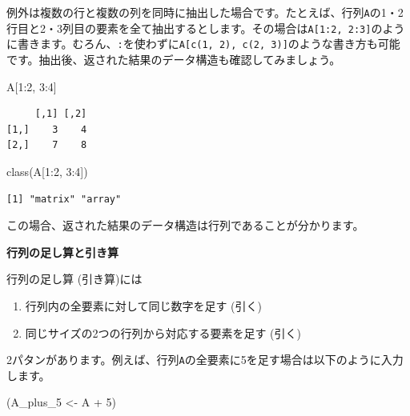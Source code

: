 \documentclass[
  a4paper,
  pandoc,
  ja=standard,
  jafont=haranoaji]{bxjsbook}
\newenvironment{Shaded}{\begin{snugshade}}{\end{snugshade}}
\newcommand{\DecValTok}[1]{\textcolor[rgb]{0.68,0.00,0.00}{#1}}
\newcommand{\FunctionTok}[1]{\textcolor[rgb]{0.28,0.35,0.67}{#1}}
\newcommand{\NormalTok}[1]{\textcolor[rgb]{0.00,0.48,0.65}{#1}}
\newcommand{\OtherTok}[1]{\textcolor[rgb]{0.00,0.48,0.65}{#1}}
\newcommand{\SpecialCharTok}[1]{\textcolor[rgb]{0.37,0.37,0.37}{#1}}
\providecommand{\tightlist}{%
  \setlength{\itemsep}{0pt}\setlength{\parskip}{0pt}}
\begin{document}
例外は複数の行と複数の列を同時に抽出した場合です。たとえば、行列\texttt{A}の1・2行目と2・3列目の要素を全て抽出するとします。その場合は\texttt{A{[}1:2,\ 2:3{]}}のように書きます。むろん、\texttt{:}を使わずに\texttt{A{[}c(1,\ 2),\ c(2,\ 3){]}}のような書き方も可能です。抽出後、返された結果のデータ構造も確認してみましょう。

\begin{Shaded}
\begin{Highlighting}[numbers=left,,]
\NormalTok{A[}\DecValTok{1}\SpecialCharTok{:}\DecValTok{2}\NormalTok{, }\DecValTok{3}\SpecialCharTok{:}\DecValTok{4}\NormalTok{]}
\end{Highlighting}
\end{Shaded}

\begin{verbatim}
     [,1] [,2]
[1,]    3    4
[2,]    7    8
\end{verbatim}

\begin{Shaded}
\begin{Highlighting}[numbers=left,,]
\FunctionTok{class}\NormalTok{(A[}\DecValTok{1}\SpecialCharTok{:}\DecValTok{2}\NormalTok{, }\DecValTok{3}\SpecialCharTok{:}\DecValTok{4}\NormalTok{])}
\end{Highlighting}
\end{Shaded}

\begin{verbatim}
[1] "matrix" "array" 
\end{verbatim}

この場合、返された結果のデータ構造は行列であることが分かります。

\textbf{行列の足し算と引き算}

行列の足し算 (引き算)には

\begin{enumerate}
\def\labelenumi{\arabic{enumi}.}
\tightlist
\item
  行列内の全要素に対して同じ数字を足す (引く)
\item
  同じサイズの2つの行列から対応する要素を足す (引く)
\end{enumerate}

2パタンがあります。例えば、行列\texttt{A}の全要素に5を足す場合は以下のように入力します。

\begin{Shaded}
\begin{Highlighting}[numbers=left,,]
\NormalTok{(A\_plus\_5 }\OtherTok{\textless{}{-}}\NormalTok{ A }\SpecialCharTok{+} \DecValTok{5}\NormalTok{)}
\end{Highlighting}
\end{Shaded}
\end{document}
